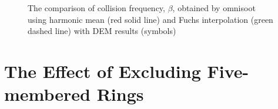 \begin{figure}[H]
	\centering
	\caption{The comparison of collision frequency, $\beta$, obtained by omnisoot using harmonic mean (red solid line) and Fuchs interpolation (green dashed line) with DEM results (symbols)~\citep{goudeli2015coagulation}}
	\label{fig:kernelvalid} 
\end{figure}



\section{The Effect of Excluding Five-membered Rings}

